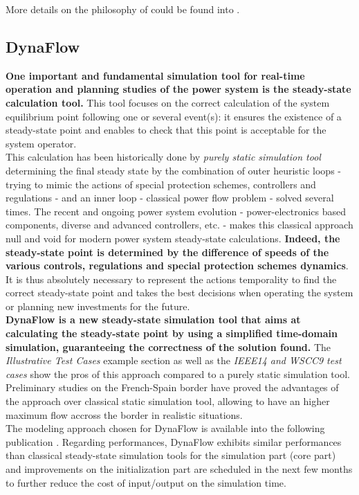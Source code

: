 \documentclass[a4paper, 12pt]{report}
\begin{document}
More details on the philosophy of \Dynawo could be found into \cite{Dynawo}.

\newpage
\subsection{DynaFlow}

\textbf{One important and fundamental simulation tool for real-time operation and planning studies of the power system is the steady-state calculation tool.} This tool focuses on the correct calculation of the system equilibrium point following one or several event(s): it ensures the existence of a steady-state point and enables to check that this point is acceptable for the system operator. \\

This calculation has been historically done by \textit{purely static simulation tool} determining the final steady state by the combination of outer heuristic loops - trying to mimic the actions of special protection schemes, controllers and regulations - and an inner loop - classical power flow problem - solved several times. The recent and ongoing power system evolution - power-electronics based components, diverse and advanced controllers, etc. - makes this classical approach null and void for modern power system steady-state calculations. \textbf{Indeed, the steady-state point is determined by the difference of speeds of the various controls, regulations and special protection schemes dynamics}. It is thus absolutely necessary to represent the actions temporality to find the correct steady-state point and takes the best decisions when operating the system or planning new investments for the future. \\

\textbf{DynaFlow is a new steady-state simulation tool that aims at calculating the steady-state point by using a simplified time-domain simulation, guaranteeing the correctness of the solution found.} The \textit{Illustrative Test Cases} example section as well as the \textit{IEEE14 and WSCC9 test cases} show the pros of this approach compared to a purely static simulation tool. Preliminary studies on the French-Spain border have proved the advantages of the approach over classical static simulation tool, allowing to have an higher maximum flow accross the border in realistic situations.\\

The modeling approach chosen for DynaFlow is available into the following publication \cite{DynaFlow}.
Regarding performances, DynaFlow exhibits similar performances than classical steady-state simulation tools for the simulation part (core part) and improvements on the initialization part are scheduled in the next few months to further reduce the cost of input/output on the simulation time. \\
\end{document}
